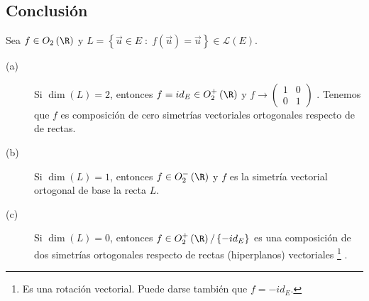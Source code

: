 \subsection*{Conclusión}
\begin{observation}
\normalfont 
Sea $\displaystyle f \in O_{2}\left(\R\right) $ y $\displaystyle L = \left\{ \vec{u} \in E \; : \; f\left(\vec{u}\right) = \vec{u}\right\} \in \mathcal{L}\left(E\right) $. 
\begin{description}
	\item[(a)] Si $\displaystyle \dim\left(L\right) = 2 $, entonces $\displaystyle f = id _{E} \in O^{+}_{2}\left(\R\right) $ y $\displaystyle f \to \begin{pmatrix} 1 & 0 \\ 0 & 1 \end{pmatrix} $ . Tenemos que $\displaystyle f $ es composición de cero simetrías vectoriales ortogonales respecto de de rectas.
	\item[(b)] Si $\displaystyle \dim\left(L\right) = 1 $, entonces $\displaystyle f \in O^{-}_{2}\left(\R\right) $ y $\displaystyle f $ es la simetría vectorial ortogonal de base la recta $\displaystyle L $.
	\item[(c)] Si $\displaystyle \dim\left(L\right) = 0 $, entonces $\displaystyle f \in O^{+}_{2}\left(\R\right) / \left\{ -id _{E}\right\} $ es una composición de dos simetrías ortogonales respecto de rectas (hiperplanos) vectoriales \footnote{Es una rotación vectorial. Puede darse también que $\displaystyle f = - id _{E} $.} .
\end{description}
\end{observation}
